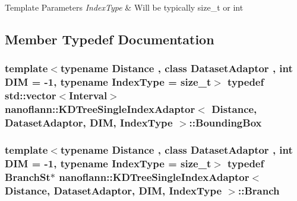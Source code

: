 \begin{DoxyTemplParams}{Template Parameters}
{\em Index\-Type} & Will be typically size\-\_\-t or int \\
\hline
\end{DoxyTemplParams}


\subsection{Member Typedef Documentation}
\hypertarget{classnanoflann_1_1_k_d_tree_single_index_adaptor_a4ba3fe322e4ded9cb1530476c971be24}{
\subsubsection[{Bounding\-Box}]{\setlength{\rightskip}{0pt plus 5cm}template$<$typename Distance , class Dataset\-Adaptor , int D\-I\-M = -\/1, typename Index\-Type  = size\-\_\-t$>$ typedef std\-::vector$<${\bf Interval}$>$ {\bf nanoflann\-::\-K\-D\-Tree\-Single\-Index\-Adaptor}$<$ Distance, Dataset\-Adaptor, D\-I\-M, Index\-Type $>$\-::{\bf Bounding\-Box}\hspace{0.3cm}{\ttfamily [protected]}}}\label{classnanoflann_1_1_k_d_tree_single_index_adaptor_a4ba3fe322e4ded9cb1530476c971be24}
\hypertarget{classnanoflann_1_1_k_d_tree_single_index_adaptor_ae84d5d1db0245a55ae3cb7f727f3ea79}{
\subsubsection[{Branch}]{\setlength{\rightskip}{0pt plus 5cm}template$<$typename Distance , class Dataset\-Adaptor , int D\-I\-M = -\/1, typename Index\-Type  = size\-\_\-t$>$ typedef {\bf Branch\-St}$\ast$ {\bf nanoflann\-::\-K\-D\-Tree\-Single\-Index\-Adaptor}$<$ Distance, Dataset\-Adaptor, D\-I\-M, Index\-Type $>$\-::{\bf Branch}\hspace{0.3cm}{\ttfamily [protected]}}}\label{classnanoflann_1_1_k_d_tree_single_index_adaptor_ae84d5d1db0245a55ae3cb7f727f3ea79}
